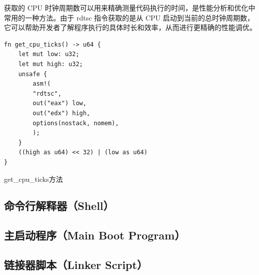 获取的 CPU 时钟周期数可以用来精确测量代码执行的时间，是性能分析和优化中常用的一种方法。由于 rdtsc 指令获取的是从 CPU 启动到当前的总时钟周期数，它可以帮助开发者了解程序执行的具体时长和效率，从而进行更精确的性能调优。

\begin{listing}[htbp]
    \begin{verbatim}
fn get_cpu_ticks() -> u64 {
    let mut low: u32;
    let mut high: u32;
    unsafe {
        asm!(
        "rdtsc",
        out("eax") low,
        out("edx") high,
        options(nostack, nomem),
        );
    }
    ((high as u64) << 32) | (low as u64)
}
    \end{verbatim}
    \caption{get\_cpu\_ticks方法}\label{lst:GetCpuTicksMethod}
\end{listing}

\subsection{命令行解释器（Shell）}

\subsection{主启动程序（Main Boot Program）}

\subsection{链接器脚本（Linker Script）}